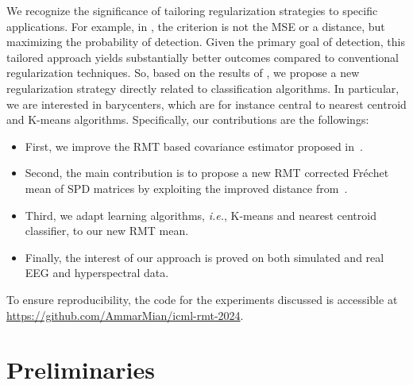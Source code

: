 \documentclass{article}
\theoremstyle{plain}
\theoremstyle{definition}
\theoremstyle{remark}
\begin{document}
We recognize the significance of tailoring regularization strategies to specific applications. For example, in \cite{Kammoun2017}, the criterion is not the MSE or a distance, but maximizing the probability of detection. Given the primary goal of detection, this tailored approach yields substantially better outcomes compared to conventional regularization techniques. So, based on the results of \cite{couillet2019random,tiomoko2019random}, we propose a new regularization strategy directly related to classification algorithms.
In particular, we are interested in barycenters, which are for instance central to nearest centroid and K-means algorithms.
Specifically, our contributions are the followings:
\begin{itemize}
    \item First, we improve the RMT based covariance estimator proposed in~\cite{tiomoko2019random}. 
    \item Second, the main contribution is to propose a new RMT corrected Fréchet mean of SPD matrices by exploiting the improved distance from~\cite{couillet2019random}.
    \item Third, we adapt learning algorithms, \emph{i.e.}, K-means and nearest centroid classifier, to our new RMT mean.
    \item Finally, the interest of our approach is proved on both simulated and real EEG and hyperspectral data.
\end{itemize}


To ensure reproducibility, the code for the experiments discussed is accessible at \url{https://github.com/AmmarMian/icml-rmt-2024}.

\section{Preliminaries}
\end{document}
